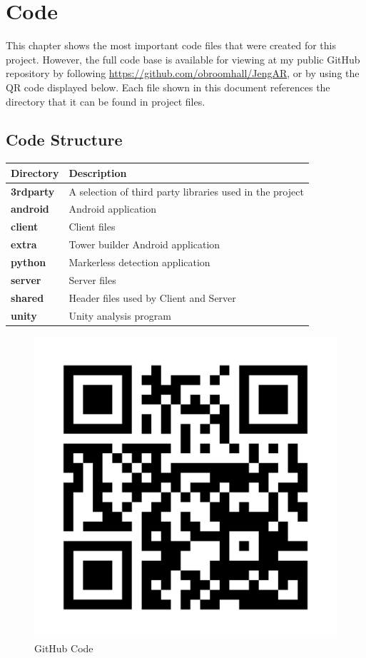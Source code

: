 \chapter{Code}\label{chap:code}

This chapter shows the most important code files that were created for this project. However, the full code base is available for viewing at my public GitHub repository by following \url{https://github.com/obroomhall/JengAR}, or by using the QR code displayed below. Each file shown in this document references the directory that it can be found in project files.

\vfill
\section{Code Structure}

\begin{table}[ht]
\centering
\begin{tabular}{l|l}
\textbf{Directory} & \textbf{Description} \\ \hline
\textbf{3rdparty} & A selection of third party libraries used in the project  \\
\textbf{android} & Android application  \\
\textbf{client} & Client files  \\
\textbf{extra} & Tower builder Android application  \\
\textbf{python} & Markerless detection application  \\
\textbf{server} & Server files  \\
\textbf{shared} & Header files used by Client and Server  \\
\textbf{unity} & Unity analysis program
\end{tabular}
\end{table}
\vfill

\begin{figure}[h]
    \centering
    \includegraphics[width=.5\linewidth]{images/code-qr}
    \caption{GitHub Code}
    \label{fig:githubqr}
\end{figure}

